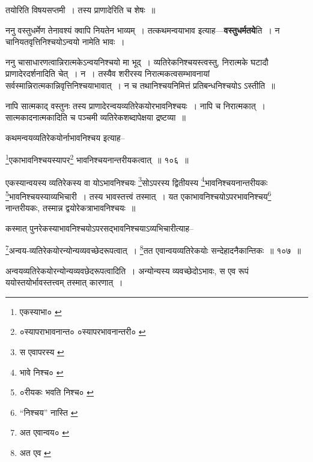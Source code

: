 \documentclass[article,12pt,a4paper]{memoir}
\begin{document}
	  \pstart तयोरिति विषयसप्तमी । तस्य प्राणादेरिति च शेषः ॥
	\pend
      

	  \pstart ननु वस्तुधर्मेण तेनावश्यं क्वापि नियतेन भाव्यम् । तत्कथमन्वयाभाव इत्याह—\textbf{वस्तुधर्मतये}ति । न चानियतवृत्तिनिश्चयोऽन्वयो नामेति भावः ।
	\pend
      

	  \pstart ननु चासाधारणत्वान्निरात्मकेऽन्वयनिश्चयो मा भूद् । व्यतिरेकनिश्चयस्त्वस्तु, निरात्मके घटादौ प्राणादेरदर्शनादिति चेत् । न । तस्यैव \leavevmode{} शरीरस्य निरात्मकत्वसम्भावनायां सर्वस्मान्निरात्मकान्निवृत्तिनिश्चयाभावात् । न च तथानिश्चयनिमित्तं प्रतिबन्धनिश्चयोऽ ऽस्तीति ॥
	\pend
	  \bigskip
	  \begingroup
	

	  \pstart नापि सात्मकाद् वस्तुनः तस्य प्राणादेरन्वयव्यतिरेकयोरभावनिश्चयः । नापि च निरात्मकात् । सात्मकादनात्मकादिति च पञ्चमी व्यतिरेकशब्दापेक्षया द्रष्टव्या ॥
	\pend
       

	  \pstart कथमन्वयव्यतिरेकयोर्नाभावनिश्चय इत्याह--
	\pend
       
	  \bigskip
	  \begingroup
	

	  \pstart \footnote{एकस्याभा० \cite{dp-msC}}\-एकाभावनिश्चयस्यापर\footnote{०स्यापराभावनान्त० \cite{dp-msB} \cite{dp-edP} \cite{dp-edH} ०स्यापरभावनान्तरी० \cite{dp-msD} \cite{dp-edE}} भावनिश्चयनान्तरीयकत्वात् ॥ १०६ ॥
	\pend
      
	  \endgroup
	 

	  \pstart एकस्यान्वयस्य व्यतिरेकस्य वा योऽभावनिश्चयः \footnote{स एवापरस्य \cite{dp-edE} \cite{dp-edN}}\-सोऽपरस्य द्वितीयस्य \footnote{भावे निश्च० \cite{dp-msA} \cite{dp-msB} \cite{dp-edP} \cite{dp-edH}}\-भावनिश्चयनान्तरीयकः \footnote{०रीयकः भवति निश्च० \cite{dp-msA} \cite{dp-msB} \cite{dp-edP} \cite{dp-edH}}\-भावनिश्चयस्याव्यभिचारी । तस्य भावस्तत्त्वं तस्मात् । यत एकाभावनिश्चयोऽपरभावनिश्चय\footnote{“निश्चय” नास्ति \cite{dp-msA} \cite{dp-msC}} नान्तरीयकः, तस्मान्न द्वयोरेकत्राभावनिश्चयः ॥
	\pend
       

	  \pstart कस्मात् पुनरेकस्याभावनिश्चयोऽपरसद्भावनिश्चयाऽव्यभिचारीत्याह--
	\pend
       
	  \bigskip
	  \begingroup
	

	  \pstart \footnote{अत एवान्वय० \cite{dp-msC}}\-अन्वय-व्यतिरेकयोरन्योन्यव्यवच्छेदरूपत्वात् । \footnote{अत एव \cite{dp-msD} \cite{dp-msB} \cite{dp-edP} \cite{dp-edH} \cite{dp-edE} \cite{dp-edN}}\-तत एवान्वयव्यतिरेकयोः सन्देहादनैकान्तिकः ॥ १०७ ॥
	\pend
      
	  \endgroup
	 

	  \pstart अन्वयव्यतिरेकयोरन्योन्यव्यवछेदरूपत्वादिति । अन्योन्यस्य व्यवच्छेदोऽभावः, स एव रूपं ययोस्तयोर्भावस्तत्त्वम् तस्मात् कारणात् ।
	\pend
       
\end{document}
